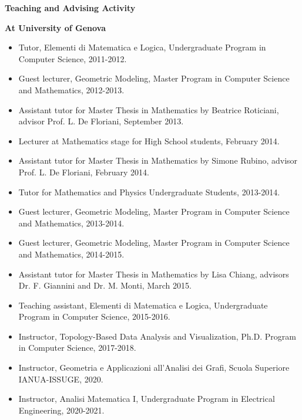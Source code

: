 \documentclass[11pt]{article}
\begin{document}

\vspace*{2.5ex}

\noindent
{\Large\bf Teaching and Advising Activity}

\vspace*{1.5ex}
\noindent
{\bf At University of Genova}

\begin{itemize}
\item Tutor, Elementi di Matematica e Logica, Undergraduate Program in Computer Science, 2011-2012.
\item Guest lecturer, Geometric Modeling, Master Program in Computer Science and Mathematics, 2012-2013.
\item Assistant tutor for Master Thesis in Mathematics by Beatrice Roticiani, advisor Prof. L. De Floriani, September 2013.
\item Lecturer at Mathematics stage for High School students, February 2014.
\item Assistant tutor for Master Thesis in Mathematics by Simone Rubino, advisor Prof. L. De Floriani, February 2014.
\item Tutor for Mathematics and Physics Undergraduate Students, 2013-2014.
\item Guest lecturer, Geometric Modeling, Master Program in Computer Science and Mathematics, 2013-2014.
\item Guest lecturer, Geometric Modeling, Master Program in Computer Science and Mathematics, 2014-2015.
\item Assistant tutor for Master Thesis in Mathematics by Lisa Chiang, advisors Dr. F. Giannini and Dr. M. Monti, March 2015.
\item Teaching assistant, Elementi di Matematica e Logica, Undergraduate Program in Computer Science, 2015-2016.
\item Instructor, Topology-Based Data Analysis and Visualization, Ph.D. Program in Computer Science, 2017-2018.
\item Instructor, Geometria e Applicazioni all'Analisi dei Grafi, Scuola Superiore IANUA-ISSUGE, 2020.
\item Instructor, Analisi Matematica I, Undergraduate Program in Electrical Engineering, 2020-2021.
\end{itemize}
\end{document}

